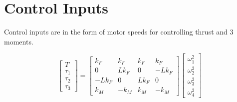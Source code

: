 \section{Control Inputs}

Control inputs are in the form of motor speeds for controlling thrust and 3 moments.
\vspace{10pt}

\[
\begin{bmatrix}
    T \\
    \tau_1 \\
    \tau_2 \\
    \tau_3
\end{bmatrix} = 
\begin{bmatrix}
    k_F & k_F & k_F & k_F \\
    0 & Lk_F & 0 & -Lk_F \\
    -Lk_F & 0 & Lk_F & 0 \\
    k_M & -k_M & k_M & -k_M
\end{bmatrix}
\begin{bmatrix}
    \omega_1^2 \\
    \omega_2^2 \\
    \omega_3^2 \\
    \omega_4^2
\end{bmatrix}
\]
\\







